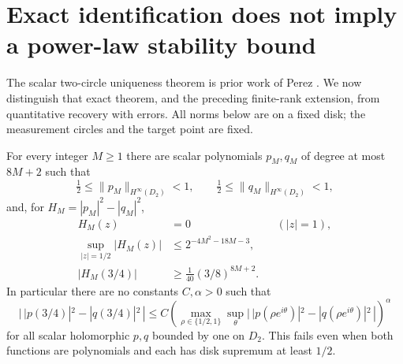 \section{Exact identification does not imply a power-law stability bound}
\label{sec:shell-instability}
The scalar two-circle uniqueness theorem is prior work of Perez
\cite{Perez2021}. We now distinguish that exact theorem, and the preceding
finite-rank extension, from quantitative recovery with errors. All norms below
are on a fixed disk; the measurement circles and the target point are fixed.

\begin{theorem}\label{thm:shell-instability}
For every integer $M\ge1$ there are scalar polynomials $p_M,q_M$ of degree
at most $8M+2$ such that
\[
 \tfrac12\le\|p_M\|_{H^\infty(D_2)}<1,\qquad
 \tfrac12\le\|q_M\|_{H^\infty(D_2)}<1,
\]
and, for $H_M=|p_M|^2-|q_M|^2$,
\begin{align}
 H_M(z)&=0 &&(|z|=1),\\
 \sup_{|z|=1/2}|H_M(z)|&\le 2^{-4M^2-18M-3},\\
 |H_M(3/4)|&\ge\frac1{40}(3/8)^{8M+2}.
\end{align}
In particular there are no constants $C,\alpha>0$ such that
\[
 |\,|p(3/4)|^2-|q(3/4)|^2\,|
 \le C\left(\max_{\rho\in\{1/2,1\}}\sup_\theta
 |\,|p(\rho e^{i\theta})|^2-|q(\rho e^{i\theta})|^2\,|\right)^\alpha
\]
for all scalar holomorphic $p,q$ bounded by one on $D_2$. This fails even
when both functions are polynomials and each has disk supremum at least $1/2$.
\end{theorem}
